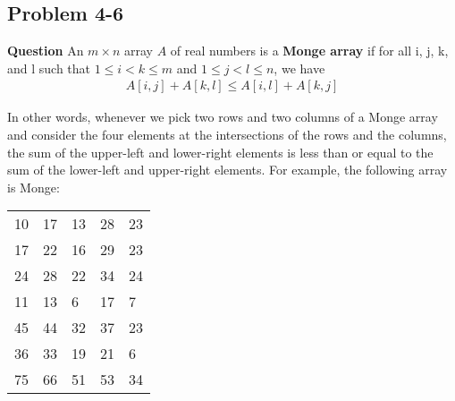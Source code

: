 \documentclass[]{book}
\theoremstyle{definition}
\begin{document}
\subsection*{Problem 4-6}

\textbf{Question} 
An $ m \times n$ array $A$ of real numbers is a \textbf{Monge array} if for all i, j, k, and l such
that $1 \leq i < k \leq m$ and $1 \leq j < l \leq n$, we have
\begin{align*}
    A[i, j] + A[k, l] \leq A[i, l] + A[k, j]
\end{align*}

In other words, whenever we pick two rows and two columns of a Monge array and
consider the four elements at the intersections of the rows and the columns, the sum
of the upper-left and lower-right elements is less than or equal to the sum of the
lower-left and upper-right elements. For example, the following array is Monge:

\begin{table}[H]
\centering
\captionsetup{labelfont=it,justification=centering} 		%
\begin{tabular}{l l l l l} %
    10 & 17 & 13 & 28 & 23  \tabularnewline
    17 & 22 & 16 & 29 & 23  \tabularnewline
    24 & 28 & 22 & 34 & 24  \tabularnewline
    11 & 13 & 6 & 17 & 7    \tabularnewline
    45 & 44 & 32 & 37 & 23  \tabularnewline
    36 & 33 & 19 & 21 & 6   \tabularnewline
    75 & 66 & 51 & 53 & 34  \tabularnewline
\end{tabular}
\end{table}
\end{document}
